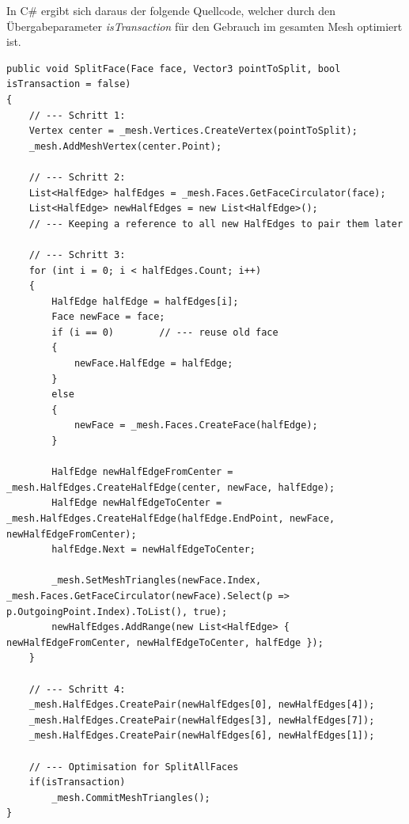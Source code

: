 In C\# ergibt sich daraus der folgende Quellcode, welcher durch den \"Ubergabeparameter \textit{isTransaction} f\"ur den Gebrauch im gesamten Mesh optimiert ist.
\begin{lstlisting}
public void SplitFace(Face face, Vector3 pointToSplit, bool isTransaction = false)
{
	// --- Schritt 1:
	Vertex center = _mesh.Vertices.CreateVertex(pointToSplit);
	_mesh.AddMeshVertex(center.Point);

	// --- Schritt 2:
	List<HalfEdge> halfEdges = _mesh.Faces.GetFaceCirculator(face);
	List<HalfEdge> newHalfEdges = new List<HalfEdge>(); 
	// --- Keeping a reference to all new HalfEdges to pair them later

	// --- Schritt 3:
	for (int i = 0; i < halfEdges.Count; i++)
	{
		HalfEdge halfEdge = halfEdges[i];
		Face newFace = face;
		if (i == 0)        // --- reuse old face
		{
			newFace.HalfEdge = halfEdge;
		}
		else
		{
			newFace = _mesh.Faces.CreateFace(halfEdge);
		}

		HalfEdge newHalfEdgeFromCenter = _mesh.HalfEdges.CreateHalfEdge(center, newFace, halfEdge);
		HalfEdge newHalfEdgeToCenter = _mesh.HalfEdges.CreateHalfEdge(halfEdge.EndPoint, newFace, newHalfEdgeFromCenter);
		halfEdge.Next = newHalfEdgeToCenter;

		_mesh.SetMeshTriangles(newFace.Index, _mesh.Faces.GetFaceCirculator(newFace).Select(p => p.OutgoingPoint.Index).ToList(), true);
		newHalfEdges.AddRange(new List<HalfEdge> { newHalfEdgeFromCenter, newHalfEdgeToCenter, halfEdge });
	}
	
	// --- Schritt 4:
	_mesh.HalfEdges.CreatePair(newHalfEdges[0], newHalfEdges[4]);
	_mesh.HalfEdges.CreatePair(newHalfEdges[3], newHalfEdges[7]);
	_mesh.HalfEdges.CreatePair(newHalfEdges[6], newHalfEdges[1]);

	// --- Optimisation for SplitAllFaces
	if(isTransaction)
		_mesh.CommitMeshTriangles();
}
\end{lstlisting}

